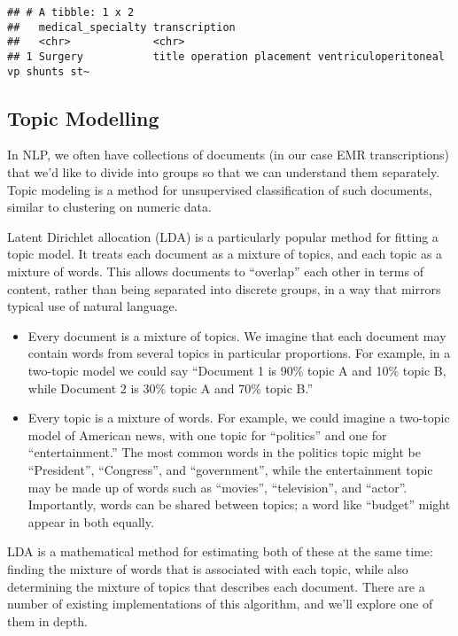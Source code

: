 \documentclass[
]{article}
\begin{document}
\begin{verbatim}
## # A tibble: 1 x 2
##   medical_specialty transcription                                               
##   <chr>             <chr>                                                       
## 1 Surgery           title operation placement ventriculoperitoneal vp shunts st~
\end{verbatim}

\subsection{Topic Modelling}\label{topic-modelling}

In NLP, we often have collections of documents (in our case EMR
transcriptions) that we'd like to divide into groups so that we can
understand them separately. Topic modeling is a method for unsupervised
classification of such documents, similar to clustering on numeric data.

Latent Dirichlet allocation (LDA) is a particularly popular method for
fitting a topic model. It treats each document as a mixture of topics,
and each topic as a mixture of words. This allows documents to
``overlap'' each other in terms of content, rather than being separated
into discrete groups, in a way that mirrors typical use of natural
language.

\begin{itemize}
\item
  Every document is a mixture of topics. We imagine that each document
  may contain words from several topics in particular proportions. For
  example, in a two-topic model we could say ``Document 1 is 90\% topic
  A and 10\% topic B, while Document 2 is 30\% topic A and 70\% topic
  B.''
\item
  Every topic is a mixture of words. For example, we could imagine a
  two-topic model of American news, with one topic for ``politics'' and
  one for ``entertainment.'' The most common words in the politics topic
  might be ``President'', ``Congress'', and ``government'', while the
  entertainment topic may be made up of words such as ``movies'',
  ``television'', and ``actor''. Importantly, words can be shared
  between topics; a word like ``budget'' might appear in both equally.
\end{itemize}

LDA is a mathematical method for estimating both of these at the same
time: finding the mixture of words that is associated with each topic,
while also determining the mixture of topics that describes each
document. There are a number of existing implementations of this
algorithm, and we'll explore one of them in depth.
\end{document}
